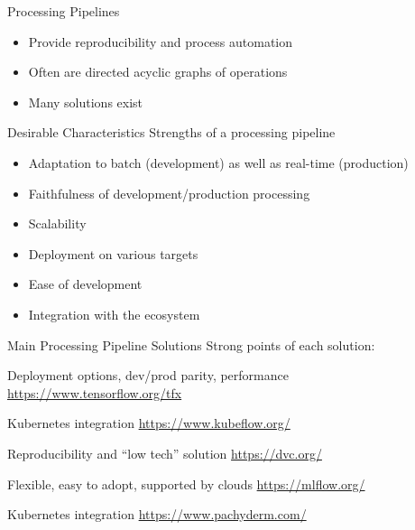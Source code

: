 \begin{frame}{Processing Pipelines}

  \begin{itemize}
    \item Provide reproducibility and process automation
    \item Often are directed acyclic graphs of operations
    \item Many solutions exist
  \end{itemize}

  \hugo
\end{frame}


\begin{frame}{Desirable Characteristics}
  Strengths of a processing pipeline
  \begin{itemize}
    \item Adaptation to batch (development) as well as real-time (production)
    \item Faithfulness of development/production processing
    \item Scalability
    \item Deployment on various targets
    \item Ease of development
    \item Integration with the ecosystem
  \end{itemize}

  \hugo
\end{frame}


\begin{frame}{Main Processing Pipeline Solutions}
  Strong points of each solution:

  \begin{description}
    \item Deployment options, dev/prod parity, performance\\ \url{https://www.tensorflow.org/tfx}
    \item Kubernetes integration \url{https://www.kubeflow.org/}
    \item Reproducibility and ``low tech'' solution \url{https://dvc.org/}
    \item Flexible, easy to adopt, supported by clouds \url{https://mlflow.org/}
    \item Kubernetes integration \url{https://www.pachyderm.com/}
  \end{description}

  \hugo
\end{frame}



